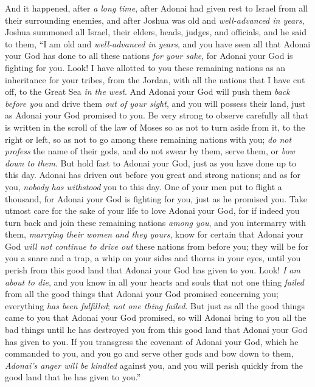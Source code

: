 \begin{biblechapter} %
 And it happened, after \textit{a long time}, after Adonai had given rest to Israel from all their surrounding enemies, and after Joshua was old and \textit{well-advanced in years},
\verse Joshua summoned all Israel, their elders, heads, judges, and officials, and he said to them, “I am old and \textit{well-advanced in years},
\verse and you have seen all that Adonai your God has done to all these nations \textit{for your sake}, for Adonai your God is fighting for you.
\verse Look! I have allotted to you these remaining nations as an inheritance for your tribes, from the Jordan, with all the nations that I have cut off, to the Great Sea \textit{in the west}.
\verse And Adonai your God will push them \textit{back before you} and drive them \textit{out of your sight}, and you will possess their land, just as Adonai your God promised to you.
\verse Be very strong to observe carefully all that is written in the scroll of the law of Moses so as not to turn aside from it, to the right or left,
\verse so as not to go among these remaining nations with you; \textit{do not profess} the name of their gods, and do not swear by them, serve them, or \textit{bow down to them}.
\verse But hold fast to Adonai your God, just as you have done up to this day.
\verse Adonai has driven out before you great and strong nations; and as for you, \textit{nobody has withstood} you to this day.
\verse One of your men put to flight a thousand, for Adonai your God is fighting for you, just as he promised you.
\verse Take utmost care for the sake of your life to love Adonai your God,
\verse for if indeed you turn back and join these remaining nations \textit{among you}, and you intermarry with them, \textit{marrying their women and they yours},
\verse know for certain that Adonai your God \textit{will not continue to drive out} these nations from before you; they will be for you a snare and a trap, a whip on your sides and thorns in your eyes, until you perish from this good land that Adonai your God has given to you.
\verse Look! \textit{I am about to die}, and you know in all your hearts and souls that not one thing \textit{failed} from all the good things that Adonai your God promised concerning you; everything \textit{has been fulfilled}; \textit{not one thing failed}.
\verse But just as all the good things came to you that Adonai your God promised, so will Adonai bring to you all the bad things until he has destroyed you from this good land that Adonai your God has given to you.
\verse If you transgress the covenant of Adonai your God, which he commanded to you, and you go and serve other gods and bow down to them, \textit{Adonai’s anger will be kindled} against you, and you will perish quickly from the good land that he has given to you.”
\end{biblechapter}

